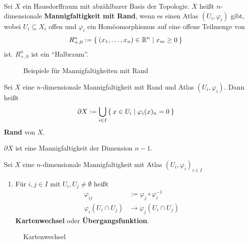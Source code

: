 \begin{definition}
    Sei $X$ ein Hausdorffraum mit abzählbarer Basis der Topologie.
    $X$ heißt $n$-dimensionale \textbf{Mannigfaltigkeit mit Rand},
    wenn es einen Atlas $(U_i, \varphi_i)$ gibt, wobei $U_i \subseteq X_i$
    offen und $\varphi_i$ ein Homöomorphismus auf eine offene 
    Teilmenge von 
    \[R_{+,0}^n := \Set{(x_1, \dots, x_n) \in \ensuremath{\mathbb{R}}^n | x_m \geq 0}\]
    ist. $R_{+,0}^n$ ist ein \enquote{Halbraum}.
\end{definition}

\begin{figure}[ht]
    \centering
    \subfloat[Halbraum]{
        
        \label{fig:half-space}
    }%

    \label{Mannigfaltigkeiten mit Rand}
    \caption{Beispiele für Mannigfaltigkeiten mit Rand}
\end{figure}

\begin{definition}
    Sei $X$ eine $n$-dimensionale Mannigfaltigkeit mit Rand und
    Atlas $(U_i, \varphi_i)$. Dann heißt 
    \[\partial X := \bigcup_{i\in I} \Set{x \in U_i | \varphi_i (x)_n = 0}\]
    \textbf{Rand} von $X$.
\end{definition}

$\partial X$ ist eine Mannigfaltigkeit der Dimension $n-1$.

\begin{definition}
    Sei $X$ eine $n$-dimensionale Mannigfaltigkeit mit Atlas
    $(U_i, \varphi_i)_{i \in I}$

    \begin{enumerate}[label=\alph*)]
        \item Für $i, j \in I$ mit $U_i, U_j \neq \emptyset$ heißt
              \begin{align*}
                \varphi_{ij} &:= \varphi_j \circ \varphi_i^{-1}\\
                \varphi_i (U_i \cap U_j) &\rightarrow \varphi_j (U_i \cap U_j)
              \end{align*}
              \textbf{Kartenwechsel} oder \textbf{Übergangsfunktion}.
    \end{enumerate}
\end{definition}

\begin{figure}[htp]
    \centering
    
    \caption{Kartenwechsel}
    \label{fig:kartenwechsel}
\end{figure}


